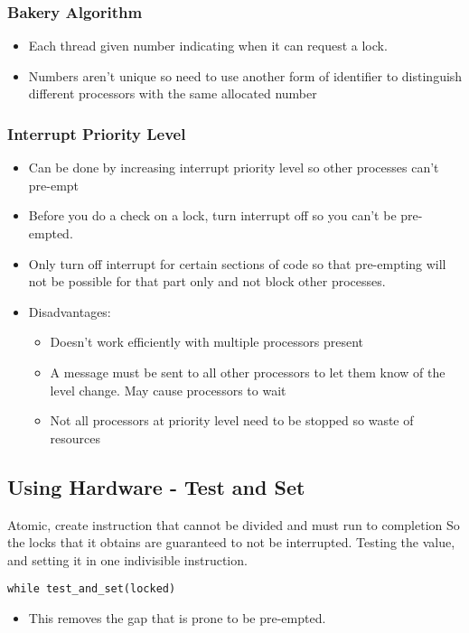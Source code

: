 \documentclass{article}
\begin{document}
	\subsubsection{Bakery Algorithm}
		\begin{itemize}
			\item Each thread given number indicating when it can request a lock.
			\item Numbers aren't unique so need to use another form of identifier to distinguish different processors with the same allocated number
		\end{itemize}
			
	\subsubsection{Interrupt Priority Level}
		\begin{itemize}
			\item Can be done by increasing interrupt priority level so other processes can't pre-empt
			\item Before you do a check on a lock, turn interrupt off so you can't be pre-empted.
			\item Only turn off interrupt for certain sections of code so that pre-empting will not be possible for that part only and not block other processes.\\

			\item Disadvantages:
			\begin{itemize}
				\item Doesn't work efficiently with multiple processors present
				\item A message must be sent to all other processors to let them know of the level change. May cause processors to wait
				\item Not all processors at priority level need to be stopped so waste of resources
			\end{itemize}
		\end{itemize}
			

	\subsection{Using Hardware - Test and Set}
		Atomic, create instruction that cannot be divided and must run to completion
		So the locks that it obtains are guaranteed to not be interrupted.
		Testing the value, and setting it in one indivisible instruction.

		\texttt{while test\_and\_set(locked)}
		\begin{itemize}
			\item This removes the gap that is prone to be pre-empted.

		\end{itemize}
\end{document}
